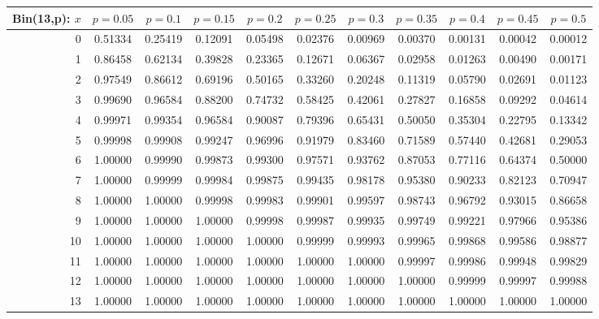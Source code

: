 \vspace{8pt minus 6pt}
\begin{tabular}{@{\extracolsep{-2pt}}|r|c|c|c|c|c|c|c|c|c|c|}
\hline
Bin(13,p): $x$
   & $p\!=\!0.05$& $p\!=\!0.1$& $p\!=\!0.15$& $p\!=\!0.2$& $p\!=\!0.25$& $p\!=\!0.3$& $p\!=\!0.35$& $p\!=\!0.4$& $p\!=\!0.45$& $p\!=\!0.5$\\\hline
  0&0.51334&0.25419&0.12091&0.05498&0.02376&0.00969&0.00370&0.00131&0.00042&0.00012\\
  1&0.86458&0.62134&0.39828&0.23365&0.12671&0.06367&0.02958&0.01263&0.00490&0.00171\\
  2&0.97549&0.86612&0.69196&0.50165&0.33260&0.20248&0.11319&0.05790&0.02691&0.01123\\
  3&0.99690&0.96584&0.88200&0.74732&0.58425&0.42061&0.27827&0.16858&0.09292&0.04614\\
  4&0.99971&0.99354&0.96584&0.90087&0.79396&0.65431&0.50050&0.35304&0.22795&0.13342\\
  5&0.99998&0.99908&0.99247&0.96996&0.91979&0.83460&0.71589&0.57440&0.42681&0.29053\\
  6&1.00000&0.99990&0.99873&0.99300&0.97571&0.93762&0.87053&0.77116&0.64374&0.50000\\
  7&1.00000&0.99999&0.99984&0.99875&0.99435&0.98178&0.95380&0.90233&0.82123&0.70947\\
  8&1.00000&1.00000&0.99998&0.99983&0.99901&0.99597&0.98743&0.96792&0.93015&0.86658\\
  9&1.00000&1.00000&1.00000&0.99998&0.99987&0.99935&0.99749&0.99221&0.97966&0.95386\\
 10&1.00000&1.00000&1.00000&1.00000&0.99999&0.99993&0.99965&0.99868&0.99586&0.98877\\
 11&1.00000&1.00000&1.00000&1.00000&1.00000&1.00000&0.99997&0.99986&0.99948&0.99829\\
 12&1.00000&1.00000&1.00000&1.00000&1.00000&1.00000&1.00000&0.99999&0.99997&0.99988\\
 13&1.00000&1.00000&1.00000&1.00000&1.00000&1.00000&1.00000&1.00000&1.00000&1.00000\\
\hline
\end{tabular}

